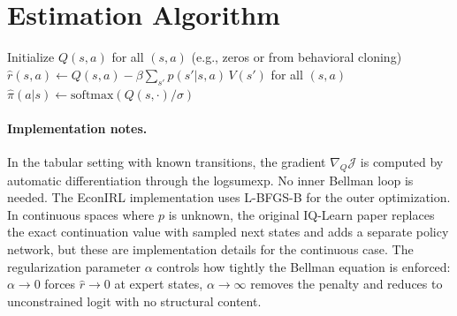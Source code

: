 \documentclass[11pt]{article}
\begin{document}
\section{Estimation Algorithm}

\begin{algorithm}[H]
\DontPrintSemicolon
\caption{IQ-Learn (tabular DDC setting)}
\label{alg:iqlearn}
\BlankLine
Initialize $Q(s,a)$ for all $(s,a)$ (e.g., zeros or from behavioral cloning)\;
\BlankLine
{}
\BlankLine
{}
$\hat{r}(s,a) \leftarrow Q(s,a) - \beta\sum_{s'} p(s'|s,a)\,V(s')$ for all $(s,a)$\;
$\hat{\pi}(a|s) \leftarrow \text{softmax}(Q(s,\cdot)/\sigma)$\;
\BlankLine
{}
\end{algorithm}

\paragraph{Implementation notes.} In the tabular setting with known transitions, the gradient $\nabla_Q \mathcal{J}$ is computed by automatic differentiation through the logsumexp. No inner Bellman loop is needed. The EconIRL implementation uses L-BFGS-B for the outer optimization. In continuous spaces where $p$ is unknown, the original IQ-Learn paper replaces the exact continuation value with sampled next states and adds a separate policy network, but these are implementation details for the continuous case. The regularization parameter $\alpha$ controls how tightly the Bellman equation is enforced: $\alpha \to 0$ forces $\hat{r} \to 0$ at expert states, $\alpha \to \infty$ removes the penalty and reduces to unconstrained logit with no structural content.
\end{document}
